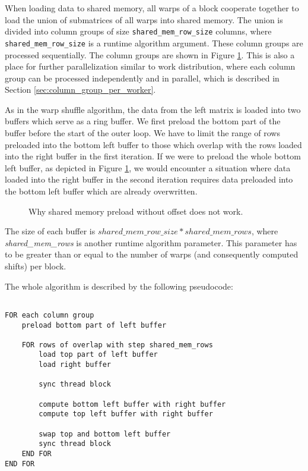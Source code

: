 When loading data to shared memory, all warps of a block cooperate together to load the union of submatrices of all warps into shared memory. The union is divided into column groups of size \texttt{shared\_mem\_row\_size} columns, where \texttt{shared\_mem\_row\_size} is a runtime algorithm argument. These column groups are processed sequentially. The column groups are shown in Figure \ref{fig:shared_mem_preload_offset}. This is also a place for further parallelization similar to work distribution, where each column group can be processed independently and in parallel, which is described in Section \ref{sec:column_group_per_worker}.

As in the warp shuffle algorithm, the data from the left matrix is loaded into two buffers which serve as a ring buffer. We first preload the bottom part of the buffer before the start of the outer loop. We have to limit the range of rows preloaded into the bottom left buffer to those which overlap with the rows loaded into the right buffer in the first iteration. If we were to preload the whole bottom left buffer, as depicted in Figure \ref{fig:shared_mem_preload_offset}, we would encounter a situation where data loaded into the right buffer in the second iteration requires data preloaded into the bottom left buffer which are already overwritten.

\begin{figure}[ht]
	\centering
	\def\svgwidth{\textwidth}
	
	\caption{Why shared memory preload without offset does not work.}
	\label{fig:shared_mem_preload_offset}
\end{figure}

The size of each buffer is $shared\_mem\_row\_size * shared\_mem\_rows$, where \textit{shared\_mem\_rows} is another runtime algorithm parameter. This parameter has to be greater than or equal to the number of warps (and consequently computed shifts) per block.

The whole algorithm is described by the following pseudocode:
\begin{lstlisting}[]

FOR each column group
	preload bottom part of left buffer

	FOR rows of overlap with step shared_mem_rows
		load top part of left buffer
		load right buffer

		sync thread block

		compute bottom left buffer with right buffer
		compute top left buffer with right buffer

		swap top and bottom left buffer
		sync thread block
	END FOR
END FOR

\end{lstlisting}

